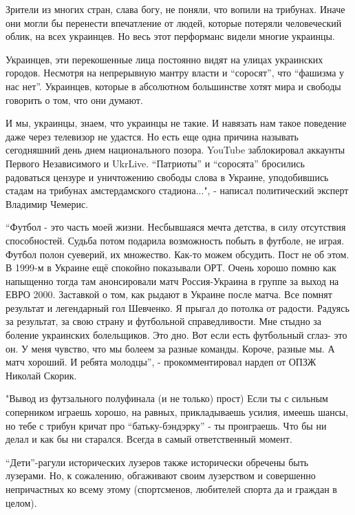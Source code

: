 Зрители из многих стран, слава богу, не поняли, что вопили на трибунах. Иначе
они могли бы перенести впечатление от людей, которые потеряли человеческий
облик, на всех украинцев. Но весь этот перформанс видели многие украинцы.

Украинцев, эти перекошенные лица постоянно видят на улицах украинских городов.
Несмотря на непрерывную мантру власти и \enquote{соросят}, что \enquote{фашизма
у нас нет}.  Украинцев, которые в абсолютном большинстве хотят мира и свободы
говорить о том, что они думают.

И мы, украинцы, знаем, что украинцы не такие. И навязать нам такое поведение
даже через телевизор не удастся. Но есть еще одна причина называть сегодняшний
день днем национального позора. YouTube заблокировал аккаунты Первого
Независимого и UkrLive. \enquote{Патриоты} и \enquote{соросята} бросились
радоваться цензуре и уничтожению свободы слова в Украине, уподобившись стадам
на трибунах амстердамского стадиона...", - написал политический эксперт
Владимир Чемерис.


\enquote{Футбол - это часть моей жизни. Несбывшаяся мечта детства, в силу отсутствия
способностей. Судьба потом подарила возможность побыть в футболе, не играя.
Футбол полон суеверий, их множество. Как-то можем обсудить. Пост не об этом. В
1999-м в Украине ещё спокойно показывали ОРТ. Очень хорошо помню как напыщенно
тогда там анонсировали матч Россия-Украина в группе за выход на ЕВРО 2000.
Заставкой о том, как рыдают в Украине после матча. Все помнят результат и
легендарный гол Шевченко. Я прыгал до потолка от радости. Радуясь за результат,
за свою страну и футбольной справедливости. Мне стыдно за боление украинских
болельщиков. Это дно. Вот если есть футбольный сглаз- это он. У меня чувство,
что мы болеем за разные команды. Короче, разные мы. А матч хороший. И ребята
молодцы}, - прокомментировал нардеп от ОПЗЖ Николай Скорик.


"Вывод из футзального полуфинала (и не только) прост) Если ты с сильным
соперником играешь хорошо, на равных, прикладываешь усилия, имеешь шансы, но
тебе с трибун кричат про \enquote{батьку-бэндэрку} - ты проиграешь. Что бы ни делал и
как бы ни старался. Всегда в самый ответственный момент.

\enquote{Дети}-рагули исторических лузеров также исторически обречены быть лузерами.
Но, к сожалению, обгаживают своим лузерством и совершенно непричастных ко всему
этому (спортсменов, любителей спорта да и граждан в целом).

